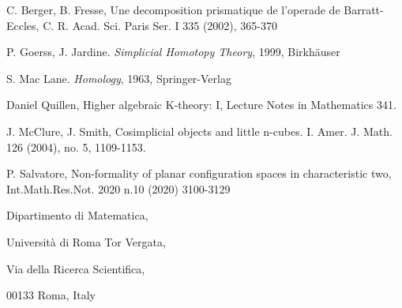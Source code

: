 \documentclass[a4paper,11pt]{article}
\theoremstyle{remark}
\theoremstyle{definition}
\begin{document}
\begin{thebibliography}{9}
	
	  C. Berger, B. Fresse, Une decomposition prismatique de l'operade de Barratt-Eccles, C. R. Acad. Sci. Paris Ser. I 335 (2002), 365-370
	 
	 
	 
	P. Goerss, J. Jardine.
	\textit{Simplicial Homotopy Theory}, 1999, Birkh\"auser

	S. Mac Lane. 
	\textit{Homology}, 1963, Springer-Verlag
	
	Daniel Quillen, Higher algebraic K-theory: I, Lecture Notes in Mathematics  341.
	
	J. McClure, J. Smith,  Cosimplicial objects and little n-cubes. I. Amer. J. Math. 126 (2004), no. 5, 1109-1153.

	
        P. Salvatore,  Non-formality of planar configuration spaces in characteristic two, Int.Math.Res.Not. 2020 n.10 (2020) 3100-3129
	
\end{thebibliography}

Dipartimento di Matematica,  

Universit\`{a} di Roma Tor Vergata, 

Via della Ricerca Scientifica, 

00133 Roma, Italy
\end{document}
